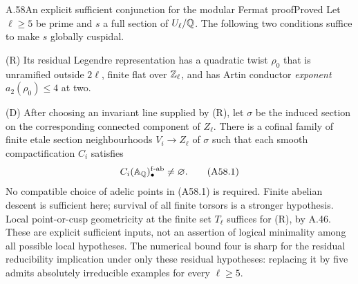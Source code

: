 \begin{statement}{A.58}{An explicit sufficient conjunction for the modular Fermat proof}{Proved}
Let $\ell\ge5$ be prime and $s$ a full section of $U_\ell/\mathbb Q$.
The following two conditions suffice to make $s$ globally cuspidal.

\textup{(R)} Its residual Legendre representation has a quadratic twist
$\rho_0$ that is unramified outside $2\ell$, finite flat over
$\mathbb Z_\ell$, and has Artin conductor \emph{exponent}
$a_2(\rho_0)\le4$ at two.

\textup{(D)} After choosing an invariant line supplied by \textup{(R)},
let $\sigma$ be the induced section on the corresponding connected
component of $Z_\ell$. There is a cofinal family of finite etale
section neighbourhoods $V_i\to Z_\ell$ of $\sigma$ such that each
smooth compactification $C_i$ satisfies
\[
 C_i(\mathbb A_\mathbb Q)_\bullet^{\mathrm{f\text{-}ab}}
       \ne\varnothing.
 \tag{A58.1}
\]
No compatible choice of adelic points in (A58.1) is required. Finite
abelian descent is sufficient here; survival of all finite torsors
is a stronger hypothesis. Local point-or-cusp geometricity at the
finite set $T_\ell$ suffices for \textup{(R)}, by A.46.
These are explicit sufficient inputs, not an assertion of logical
minimality among all possible local hypotheses.
The numerical bound four is sharp for the residual reducibility
implication under only these residual hypotheses: replacing it by
five admits absolutely irreducible examples for every $\ell\ge5$.
\end{statement}
